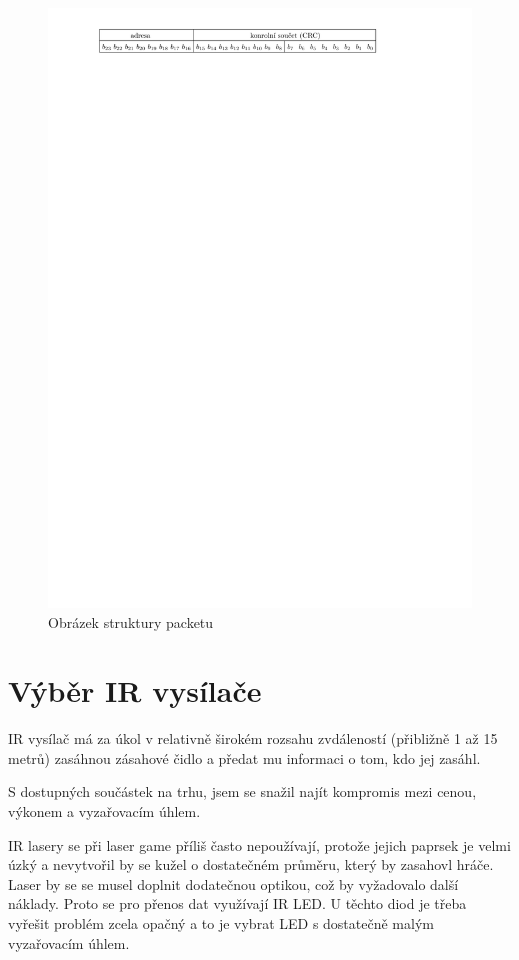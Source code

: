 \begin{figure}[H]
    \begin{center}
        \includegraphics[width=\textwidth]{img/ir-packet}
    \end{center}
    \caption{Obrázek struktury packetu}
\end{figure}

\section{Výběr IR vysílače}
IR vysílač má za úkol v relativně širokém rozsahu zvdáleností (přibližně 1 až 15 metrů) zasáhnou zásahové čidlo a předat mu informaci o tom, kdo jej zasáhl.

S dostupných součástek na trhu, jsem se snažil najít kompromis mezi cenou, výkonem a vyzařovacím úhlem.

IR lasery se při laser game příliš často nepoužívají, protože jejich paprsek je velmi úzký a nevytvořil by se kužel o dostatečném průměru, který by zasahovl hráče. Laser by se se musel doplnit dodatečnou optikou, což by vyžadovalo další náklady. Proto se pro přenos dat využívají IR LED. U těchto diod je třeba vyřešit problém zcela opačný a to je vybrat LED s dostatečně malým vyzařovacím úhlem.

